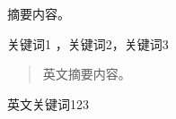 

\begin{zhaiyao}


  摘要内容。





\end{zhaiyao}




\begin{guanjianci}
关键词1 ，关键词2，关键词3
\end{guanjianci}



\begin{abstract}

  英文摘要内容。

\end{abstract}



\begin{keywords}
英文关键词123
\end{keywords}